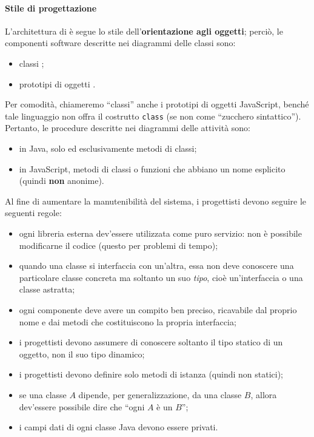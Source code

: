 	\paragraph{Stile di progettazione} L'architettura di \proj{} è segue lo stile dell'\textbf{orientazione agli oggetti}; perciò, le componenti software descritte nei diagrammi delle classi sono:
	\begin{itemize}
		\item classi ;
		\item prototipi di oggetti .
	\end{itemize}
	Per comodità, chiameremo “classi” anche i prototipi di oggetti JavaScript, benché tale linguaggio non offra il costrutto \texttt{class} (se non come “zucchero sintattico”). Pertanto, le procedure descritte nei diagrammi delle attività sono:
	\begin{itemize}
		\item in Java, solo ed esclusivamente metodi di classi;
		\item in JavaScript, metodi di classi o funzioni che abbiano un nome esplicito (quindi \textbf{non} anonime).
	\end{itemize}
	Al fine di aumentare la manutenibilità del sistema, i progettisti devono seguire le seguenti regole:
	\begin{itemize}
		\item ogni libreria esterna dev'essere utilizzata come puro servizio: non è possibile modificarne il codice (questo per problemi di tempo);
		\item quando una classe si interfaccia con un'altra, essa non deve conoscere una particolare classe concreta ma soltanto un suo \emph{tipo}, cioè un'interfaccia o una classe astratta;
		\item ogni componente deve avere un compito ben preciso, ricavabile dal proprio nome e dai metodi che costituiscono la propria interfaccia;
		\item i progettisti devono assumere di conoscere soltanto il tipo statico di un oggetto, non il suo tipo dinamico;
		\item i progettisti devono definire solo metodi di istanza (quindi non statici);
		\item se una classe $A$ dipende, per generalizzazione, da una classe $B$, allora dev'essere possibile dire che “ogni $A$ è un $B$”;
		\item i campi dati di ogni classe Java devono essere privati.
	\end{itemize}

